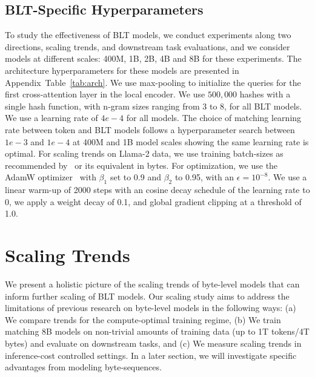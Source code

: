 \subsection{{\textsc BLT}-Specific Hyperparameters} To study the effectiveness of {\textsc BLT} models, we conduct experiments along two directions, scaling trends, and downstream task evaluations, and we consider models at different scales: 400M, 1B, 2B, 4B and 8B for these experiments. The architecture hyperparameters for these models are presented in Appendix~Table~\ref{tab:arch}. 
We use max-pooling to initialize the queries for the first cross-attention layer in the local encoder. We use $500,000$ hashes with a single hash function, with n-gram sizes ranging from 3 to 8, for all  {\textsc BLT} models. We use a learning rate of $4e-4$ for all models. The choice of matching learning rate between token and {\textsc BLT} models follows a hyperparameter search between $1e-3$ and $1e-4$ at 400M and 1B model scales showing the same learning rate is optimal. For scaling trends on Llama-2 data, we use training batch-sizes as recommended by~\cite{dubey2024llama} or its equivalent in bytes. For optimization, we use the AdamW optimizer~\citep{adamw} with $\beta_1$ set to 0.9 and $\beta_2$ to 0.95, with an $\epsilon=10^{-8}$. We use a linear warm-up of 2000 steps with an cosine decay schedule of the learning rate to 0, we apply a weight decay of 0.1, and global gradient clipping at a threshold of 1.0. 

\section{Scaling Trends}
\label{section:scaling}

We present a holistic picture of the scaling trends of byte-level models that can inform further scaling of {\textsc BLT} models. Our scaling study aims to address the limitations of previous research on byte-level models  in the following ways: (a) We compare trends for the compute-optimal training regime, (b) We train matching 8B models on non-trivial amounts of training data (up to 1T tokens/4T bytes) and evaluate on downstream tasks, and (c) We measure scaling trends in inference-cost controlled settings. In a later section, we will investigate specific advantages from modeling byte-sequences.


